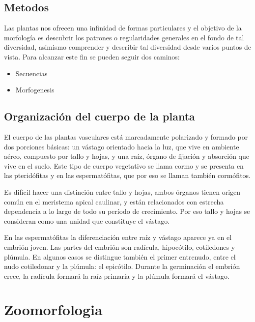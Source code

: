 \documentclass[16pt,]{krantz}
\theoremstyle{definition}
\theoremstyle{definition}
\theoremstyle{definition}
\theoremstyle{definition}
\theoremstyle{remark}
\begin{document}
\hypertarget{metodos}{%
\subsection{Metodos}\label{metodos}}

Las plantas nos ofrecen una infinidad de formas particulares y el objetivo de la morfología es descubrir los patrones o regularidades generales en el fondo de tal diversidad, asimismo comprender y describir tal diversidad desde varios puntos de vista. Para alcanzar este fin se pueden seguir dos caminos:

\begin{itemize}
\item
  Secuencias
\item
  Morfogenesis
\end{itemize}

\hypertarget{organizaciuxf3n-del-cuerpo-de-la-planta}{%
\subsection{Organización del cuerpo de la planta}\label{organizaciuxf3n-del-cuerpo-de-la-planta}}

El cuerpo de las plantas vasculares está marcadamente polarizado y formado por dos porciones básicas: un vástago orientado hacia la luz, que vive en ambiente aéreo, compuesto por tallo y hojas, y una raíz, órgano de fijación y absorción que vive en el suelo. Este tipo de cuerpo vegetativo se llama cormo y se presenta en las pteridófitas y en las espermatófitas, que por eso se llaman también cormófitos.

Es difícil hacer una distinción entre tallo y hojas, ambos órganos tienen origen común en el meristema apical caulinar, y están relacionados con estrecha dependencia a lo largo de todo su período de crecimiento. Por eso tallo y hojas se consideran como una unidad que constituye el vástago.

En las espermatófitas la diferenciación entre raíz y vástago aparece ya en el embrión joven. Las partes del embrión son radícula, hipocótilo, cotiledones y plúmula. En algunos casos se distingue también el primer entrenudo, entre el nudo cotiledonar y la plúmula: el epicótilo. Durante la germinación el embrión crece, la radícula formará la raíz primaria y la plúmula formará el vástago.

\hypertarget{zoomorfologia}{%
\section{Zoomorfologia}\label{zoomorfologia}}
\end{document}
